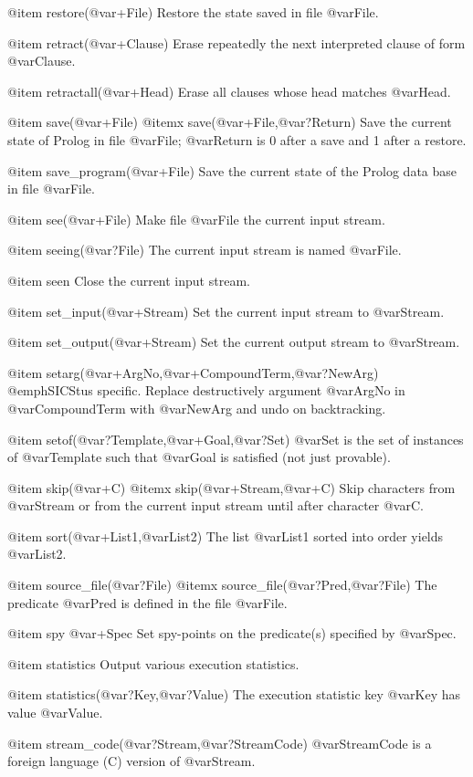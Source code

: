 {{{{{@item restore(@var{+File})
Restore the state saved in file @var{File}.

@item retract(@var{+Clause})
Erase repeatedly the next interpreted clause of form @var{Clause}.

@item retractall(@var{+Head})
Erase all clauses whose head matches @var{Head}.

@item save(@var{+File})
@itemx save(@var{+File},@var{?Return})
Save the current state of Prolog in file @var{File}; @var{Return} is 0
after a save and 1 after a restore.

@item save_program(@var{+File})
Save the current state of the Prolog data base in file @var{File}.

@item see(@var{+File})
Make file @var{File} the current input stream.

@item seeing(@var{?File})
The current input stream is named @var{File}.

@item seen
Close the current input stream.

@item set_input(@var{+Stream})
Set the current input stream to @var{Stream}.

@item set_output(@var{+Stream})
Set the current output stream to @var{Stream}.

@item setarg(@var{+ArgNo},@var{+CompoundTerm},@var{?NewArg})
@emph{SICStus specific.} Replace destructively argument @var{ArgNo} in
@var{CompoundTerm} with @var{NewArg} and undo on backtracking.

@item setof(@var{?Template},@var{+Goal},@var{?Set})
@var{Set} is the set of instances of @var{Template} such that @var{Goal}
is satisfied (not just provable).

@item skip(@var{+C})
@itemx skip(@var{+Stream},@var{+C})
Skip characters from @var{Stream} or from the current input stream until
after character @var{C}.

@item sort(@var{+List1},@var{List2})
The list @var{List1} sorted into order yields @var{List2}.

@item source_file(@var{?File})
@itemx source_file(@var{?Pred},@var{?File})
The predicate @var{Pred} is defined in the file @var{File}.

@item spy @var{+Spec}
Set spy-points on the predicate(s) specified by @var{Spec}.

@item statistics
Output various execution statistics.

@item statistics(@var{?Key},@var{?Value})
The execution statistic key @var{Key} has value @var{Value}.

@item stream_code(@var{?Stream},@var{?StreamCode})
@var{StreamCode} is a foreign language (C) version of @var{Stream}.

}}}}}
